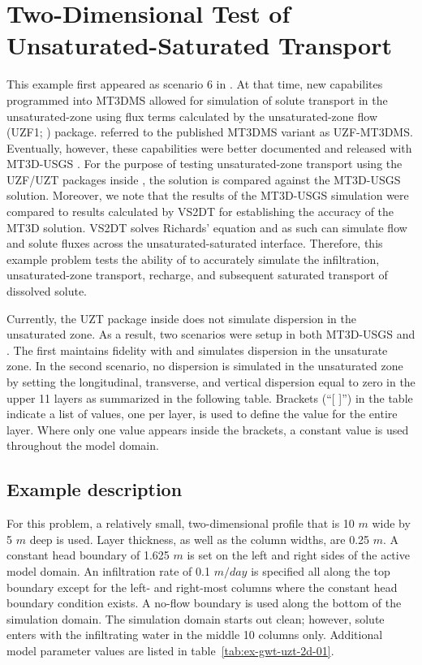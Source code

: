 \section{Two-Dimensional Test of Unsaturated-Saturated Transport}

This example first appeared as scenario 6 in \cite{morway2013}.  At that time, new capabilites programmed into MT3DMS \citep{zheng1999mt3dms} allowed for simulation of solute transport in the unsaturated-zone using flux terms calculated by the unsaturated-zone flow (UZF1; \cite{UZF}) package. \cite{morway2013} referred to the published MT3DMS variant as UZF-MT3DMS. Eventually, however, these capabilities were better documented and released with MT3D-USGS \citep{mt3dusgs}. For the purpose of testing unsaturated-zone transport using the UZF/UZT packages inside \mf, the \mf solution is compared against the MT3D-USGS solution. Moreover, we note that the results of the  MT3D-USGS simulation were compared to results calculated by VS2DT \citep{lappalaetal1987VS2D} for establishing the accuracy of the MT3D solution.  VS2DT solves Richards' equation and as such can simulate flow and solute fluxes across the unsaturated-saturated interface.  Therefore, this example problem tests the ability of \mf to accurately simulate the infiltration, unsaturated-zone transport, recharge, and subsequent saturated transport of dissolved solute.

Currently, the UZT package inside \mf does not simulate dispersion in the unsaturated zone.  As a result, two scenarios were setup in both MT3D-USGS and \mf.  The first maintains fidelity with \cite{morway2013} and simulates dispersion in the unsaturate zone.  In the second scenario, no dispersion is simulated in the unsaturated zone by setting the longitudinal, transverse, and vertical dispersion equal to zero in the upper 11 layers as summarized in the following table.  Brackets (``[ ]'') in the table indicate a list of values, one per layer, is used to define the value for the entire layer.  Where only one value appears inside the brackets, a constant value is used throughout the model domain.



\subsection{Example description}

For this problem, a relatively small, two-dimensional profile that is 10 $m$ wide by 5 $m$ deep is used.  Layer thickness, as well as the column widths, are 0.25 $m$. A constant head boundary of 1.625 $m$ is set on the left and right sides of the active model domain.  An infiltration rate of 0.1 $m/day$ is specified all along the top boundary except for the left- and right-most columns where the constant head boundary condition exists.  A no-flow boundary is used along the bottom of the simulation domain.  The simulation domain starts out clean; however, solute enters with the infiltrating water in the middle 10 columns only.  Additional model parameter values are listed in table~\ref{tab:ex-gwt-uzt-2d-01}.  

